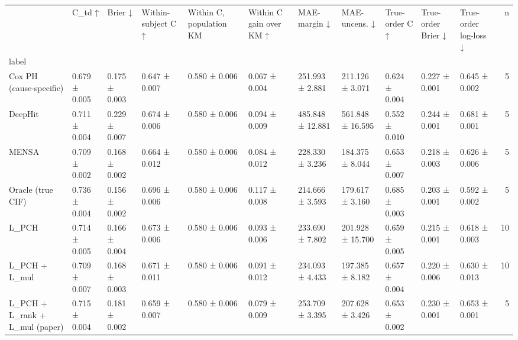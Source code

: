 \begin{tabular}{lllllllllllr}
\toprule
 & C\_td ↑ & Brier ↓ & Within-subject C ↑ & Within C, population KM & Within C gain over KM ↑ & MAE-margin ↓ & MAE-uncens. ↓ & True-order C ↑ & True-order Brier ↓ & True-order log-loss ↓ & n \\
label &  &  &  &  &  &  &  &  &  &  &  \\
\midrule
Cox PH (cause-specific) & 0.679 ± 0.005 & 0.175 ± 0.003 & 0.647 ± 0.007 & 0.580 ± 0.006 & 0.067 ± 0.004 & 251.993 ± 2.881 & 211.126 ± 3.071 & 0.624 ± 0.004 & 0.227 ± 0.001 & 0.645 ± 0.002 & 5 \\
DeepHit & 0.711 ± 0.004 & 0.229 ± 0.007 & 0.674 ± 0.006 & 0.580 ± 0.006 & 0.094 ± 0.009 & 485.848 ± 12.881 & 561.848 ± 16.595 & 0.552 ± 0.010 & 0.244 ± 0.001 & 0.681 ± 0.001 & 5 \\
MENSA & 0.709 ± 0.002 & 0.168 ± 0.002 & 0.664 ± 0.012 & 0.580 ± 0.006 & 0.084 ± 0.012 & 228.330 ± 3.236 & 184.375 ± 8.044 & 0.653 ± 0.007 & 0.218 ± 0.003 & 0.626 ± 0.006 & 5 \\
Oracle (true CIF) & 0.736 ± 0.004 & 0.156 ± 0.002 & 0.696 ± 0.006 & 0.580 ± 0.006 & 0.117 ± 0.008 & 214.666 ± 3.593 & 179.617 ± 3.160 & 0.685 ± 0.003 & 0.203 ± 0.001 & 0.592 ± 0.002 & 5 \\
L\_PCH & 0.714 ± 0.005 & 0.166 ± 0.004 & 0.673 ± 0.006 & 0.580 ± 0.006 & 0.093 ± 0.006 & 233.690 ± 7.802 & 201.928 ± 15.700 & 0.659 ± 0.005 & 0.215 ± 0.001 & 0.618 ± 0.003 & 10 \\
L\_PCH + L\_mul & 0.709 ± 0.007 & 0.168 ± 0.003 & 0.671 ± 0.011 & 0.580 ± 0.006 & 0.091 ± 0.012 & 234.093 ± 4.433 & 197.385 ± 8.182 & 0.657 ± 0.004 & 0.220 ± 0.006 & 0.630 ± 0.013 & 10 \\
L\_PCH + L\_rank + L\_mul (paper) & 0.715 ± 0.004 & 0.181 ± 0.002 & 0.659 ± 0.007 & 0.580 ± 0.006 & 0.079 ± 0.009 & 253.709 ± 3.395 & 207.628 ± 3.426 & 0.653 ± 0.002 & 0.230 ± 0.001 & 0.653 ± 0.001 & 5 \\
\bottomrule
\end{tabular}
